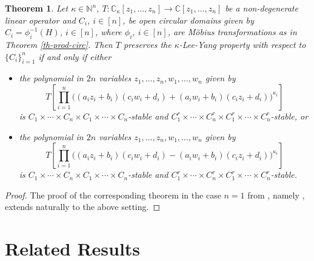 \documentclass[10pt,reqno]{amsart}
\theoremstyle{plain}
\newtheorem{theorem}{Theorem}[section]
\theoremstyle{definition}
\theoremstyle{remark}
\numberwithin{equation}{section}
\newcommand{\NN}{\mathbb{N}}
\newcommand{\HH}{\mathcal{H}}
\newcommand{\RR}{\mathbb{R}}
\newcommand{\CC}{\mathbb{C}}
\begin{document}
\begin{theorem}\label{th-ly-pres}
Let $\kappa \in \NN^n$, $T : \CC_\kappa[z_1,\ldots, z_n] \rightarrow 
\CC[z_1,\ldots, z_n]$ be a non-degenerate linear operator and 
$C_i$, $i\in [n]$, be open 
circular domains given by $C_i=\phi_i^{-1}(H)$, $i\in [n]$, 
where $\phi_i$, $i\in [n]$, are M\"obius transformations as in 
Theorem \ref{th-prod-circ}. Then $T$ preserves the $\kappa$-Lee-Yang property 
with respect to $\{C_i\}_{i=1}^{n}$ if and only if either
\begin{itemize}
\item[(a)] the polynomial in $2n$ variables $z_1,\ldots,z_n,w_1,\ldots,w_n$ 
given by
$$
T\left[\prod_{i=1}^{n}
\big((a_iz_i+b_i)(c_iw_i+d_i)+(a_iw_i+b_i)(c_iz_i+d_i)\big)^{\kappa_i}\right]
$$ 
is $C_1\times \cdots \times C_n\times C_1\times \cdots \times C_n$-stable and 
$C_1^r\times \cdots \times C_n^r\times C_1^r\times \cdots \times 
C_n^r$-stable, or
\item[(b)] the polynomial in $2n$ variables $z_1,\ldots,z_n,w_1,\ldots,w_n$ 
given by
$$
T\left[\prod_{i=1}^{n}
\big((a_iz_i+b_i)(c_iw_i+d_i)-(a_iw_i+b_i)(c_iz_i+d_i)\big)^{\kappa_i}\right]
$$ 
is $C_1\times \cdots \times C_n\times C_1\times \cdots \times C_n$-stable and 
$C_1^r\times \cdots \times C_n^r\times C_1^r\times \cdots \times 
C_n^r$-stable.
\end{itemize}
\end{theorem}

\begin{proof}
The proof of the corresponding theorem in the case $n=1$ from  \cite{BBS1},
namely \cite[Theorem 3]{BBS1}, extends naturally to the above setting. 
\end{proof}

\section{Related Results}\label{ss-95}
\end{document}

